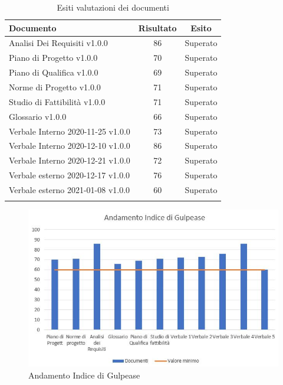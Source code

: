 \documentclass[../piano_di_qualifica.tex]{subfiles}
\begin{document}
\begin{center}
	\begin{longtable}{|l|c|c|}
		\hline
		\rowcolor{lightgray}
		\textbf{Documento}                 & \textbf{Risultato} & \textbf{Esito} \\
		\hline
		Analisi Dei Requisiti v1.0.0       & 86                 & Superato       \\
		\hline
		\hline
		Piano di Progetto v1.0.0           & 70                 & Superato       \\
		\hline
		Piano di Qualifica v1.0.0          & 69                 & Superato       \\
		\hline
		Norme di Progetto v1.0.0           & 71                 & Superato       \\
		\hline
		Studio di Fattibilità v1.0.0       & 71                 & Superato       \\
		\hline
		Glossario v1.0.0                   & 66                 & Superato       \\
		\hline
		Verbale Interno 2020-11-25 v1.0.0  & 73                 & Superato       \\
		\hline
		Verbale Interno 2020-12-10 v1.0.0  & 86                 & Superato       \\
		\hline
		Verbale Interno 2020-12-21 v1.0.0  & 72                 & Superato       \\
		\hline
		Verbale esterno 2020-12-17  v1.0.0 & 76                 & Superato       \\
		\hline
		Verbale esterno 2021-01-08  v1.0.0 & 60                 & Superato       \\
		\hline
		\hline

		\caption{Esiti valutazioni dei documenti}
	\end{longtable}
\end{center}

\begin{figure}[H]
	\centering
	\includegraphics[width=12cm]{componenti/media_gul}
	\caption{ Andamento Indice di Gulpease}
\end{figure}
\end{document}
